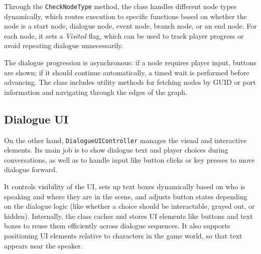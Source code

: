 Through the \verb|CheckNodeType| method, the class handles different node types dynamically, which routes execution to specific functions based on whether the node is a start node, dialogue node, event node, branch node, or an end node. For each node, it sets a \textit{Visited} flag, which can be used to track player progress or avoid repeating dialogue unnecessarily.

The dialogue progression is asynchronous: if a node requires player input, buttons are shown; if it should continue automatically, a timed wait is performed before advancing. The class includes utility methods for fetching nodes by GUID or port information and navigating through the edges of the graph.

\subsection{Dialogue UI}
On the other hand, \verb|DialogueUIController| manages the visual and interactive elements. Its main job is to show dialogue text and player choices during conversations, as well as to handle input like button clicks or key presses to move dialogue forward.

It controls visibility of the UI, sets up text boxes dynamically based on who is speaking and where they are in the scene, and adjusts button states depending on the dialogue logic (like whether a choice should be interactable, grayed out, or hidden). Internally, the class caches and stores UI elements like buttons and text boxes to reuse them efficiently across dialogue sequences. It also supports positioning UI elements relative to characters in the game world, so that text appears near the speaker.

 